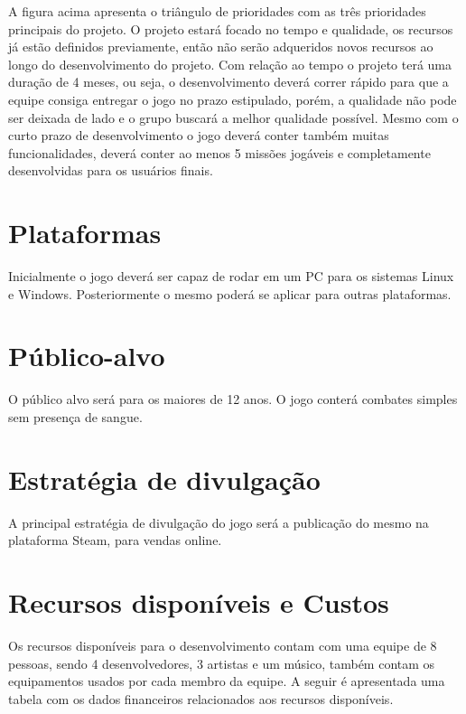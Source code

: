 \documentclass[11pt]{article} %
\begin{document}
A figura acima apresenta o triângulo de prioridades com as três prioridades principais do projeto. O projeto estará focado no tempo e qualidade, os recursos já estão definidos previamente, então não serão adqueridos novos recursos ao longo do desenvolvimento do projeto. Com relação ao tempo o projeto terá uma duração de 4 meses, ou seja, o desenvolvimento deverá correr rápido para que a equipe consiga entregar o jogo no prazo estipulado, porém, a qualidade não pode ser deixada de lado e o grupo buscará a melhor qualidade possível. 
Mesmo com o curto prazo de desenvolvimento o jogo deverá conter também muitas funcionalidades, deverá conter ao menos 5 missões jogáveis e completamente desenvolvidas para os usuários finais.

\section{Plataformas}

Inicialmente o jogo deverá ser capaz de rodar em um PC para os sistemas Linux e Windows. Posteriormente o mesmo poderá se aplicar para outras plataformas.

\section{Público-alvo}

O público alvo será para os maiores de 12 anos. O jogo conterá combates simples sem presença de sangue.

\section{Estratégia de divulgação}

A principal estratégia de divulgação do jogo será a publicação do mesmo na plataforma Steam, para vendas online.

\section{Recursos disponíveis e Custos}

Os recursos disponíveis para o desenvolvimento contam com uma equipe de 8 pessoas, sendo 4 desenvolvedores, 3 artistas e um músico, também contam os equipamentos usados por cada membro da equipe. A seguir é apresentada uma tabela com os dados financeiros relacionados aos recursos disponíveis.
\end{document}
